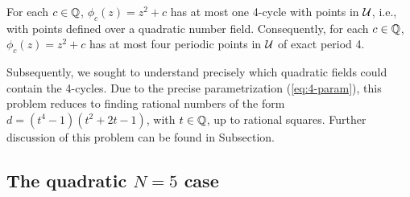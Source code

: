 \begin{theorem}
  For each $c \in \mathbb{Q}$, $\phi_c(z) = z^2 + c$ has at most one 4-cycle
  with points in $\mathcal{U}$, i.e., with points defined over a quadratic
  number field. Consequently, for each $c \in \mathbb{Q}$, $\phi_c(z) = z^2 +
  c$ has at most four periodic points in $\mathcal{U}$ of exact period 4.
\end{theorem}

Subsequently, we sought to understand precisely which quadratic fields
could contain the 4-cycles. Due to the precise parametrization
(\ref{eq:4-param}), this problem reduces to finding rational numbers
of the form $d = (t^4 - 1)(t^2 + 2t - 1)$, with $t \in \mathbb{Q}$, up to
rational squares. Further discussion of this problem can be found in
Subsection.

\subsection{The quadratic $N = 5$ case}
\label{subsec:quadratic-5}


